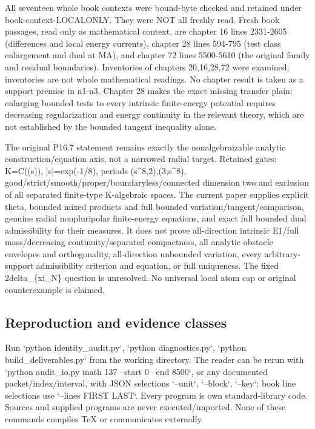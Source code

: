 \documentclass[11pt]{article}
\begin{document}
All seventeen whole book contexts were bound-byte checked and retained under book-context-LOCALONLY. They were NOT all freshly read. Fresh book passages, read only as mathematical context, are chapter 16 lines 2331-2605 (differences and local energy currents), chapter 28 lines 594-795 (test class enlargement and dual at MA), and chapter 72 lines 5500-5610 (the original family and residual boundaries). Inventories of chapters 20,16,28,72 were examined; inventories are not whole mathematical readings. No chapter result is taken as a support premise in n1-n3. Chapter 28 makes the exact missing transfer plain: enlarging bounded tests to every intrinsic finite-energy potential requires decreasing regularization and energy continuity in the relevant theory, which are not established by the bounded tangent inequality alone.

The original P16.7 statement remains exactly the nonalgebraizable analytic construction/equation axis, not a narrowed radial target. Retained gates: K=C((s)), |s|=exp(-1/8), periods (s\textasciicircum{}8,2),(3,s\textasciicircum{}8), good/strict/smooth/proper/boundaryless/connected dimension two and exclusion of all separated finite-type K-algebraic spaces. The current paper supplies explicit theta, bounded mixed products and full bounded variation/tangent/comparison, genuine radial nonpluripolar finite-energy equations, and exact full bounded dual admissibility for their measures. It does not prove all-direction intrinsic E1/full mass/decreasing continuity/separated compactness, all analytic obstacle envelopes and orthogonality, all-direction unbounded variation, every arbitrary-support admissibility criterion and equation, or full uniqueness. The fixed 2delta\_\{xi\_N\} question is unresolved. No universal local atom cap or original counterexample is claimed.

\subsection*{Reproduction and evidence classes}

Run `python identity\_audit.py`, `python diagnostics.py`, `python build\_deliverables.py` from the working directory. The reader can be rerun with `python audit\_io.py math 137 --start 0 --end 8500`, or any documented packet/index/interval, with JSON selections `--unit`, `--block`, `--key`; book line selections use `--lines FIRST LAST`. Every program is own standard-library code. Sources and supplied programs are never executed/imported. None of these commands compiles TeX or communicates externally.
\end{document}

